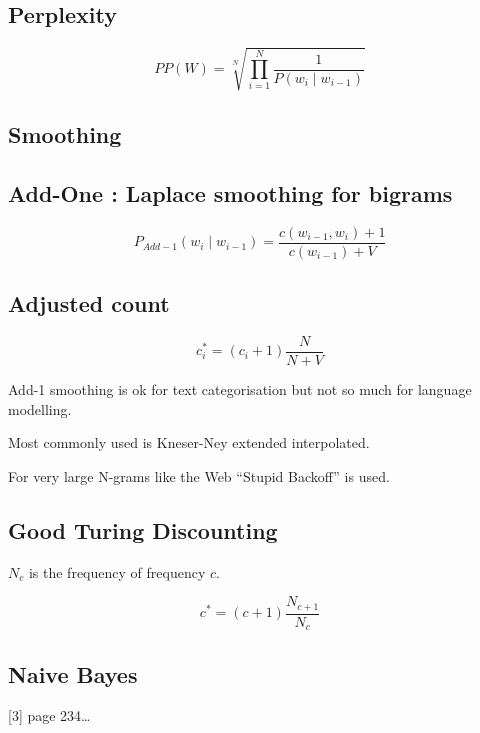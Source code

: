 \subsection*{Perplexity}

\begin{equation}
  PP(W) = \sqrt[N]{\prod_{i=1}^{N}\frac{1}{P(w_i \mid w_{i-1})}}
\end{equation}

\subsection*{Smoothing}
\subsection*{Add-One : Laplace smoothing  for bigrams}

\begin{equation}
  P_{Add-1}(w_i \mid w_{i-1}) = \frac{c(w_{i-1}, w_i) + 1}{c(w_{i-1}) + V}
\end{equation}

\subsection*{Adjusted count}

\begin{equation}
  c_i^* = (c_i+1)\frac{N}{N+V}
\end{equation}

Add-1 smoothing is ok for text categorisation but not so much for language modelling.

Most commonly used is Kneser-Ney extended interpolated.

For very large N-grams like the Web “Stupid Backoff” is used.

\subsection*{Good Turing Discounting}

$N_c$ is the frequency of frequency $c$.

\begin{equation}
  c^* = (c+1)\frac{N_{c+1}}{N_c}
\end{equation}

\subsection*{Naive Bayes}

[3] page 234…

